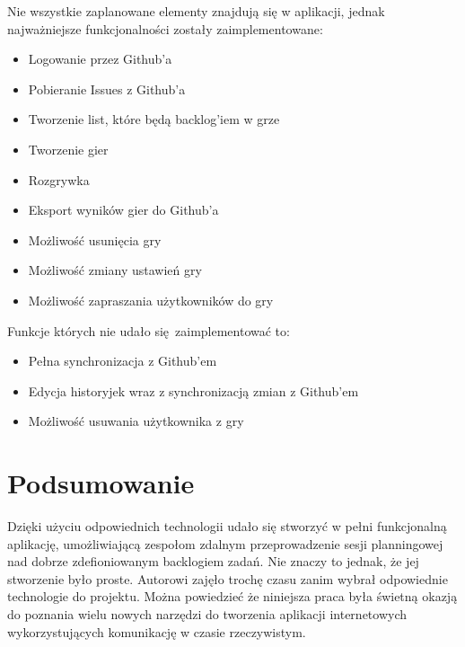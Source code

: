 Nie wszystkie zaplanowane elementy znajdują się w aplikacji,
jednak najważniejsze funkcjonalności zostały zaimplementowane:

 \begin{itemize}
	\item Logowanie przez Github'a
	\item Pobieranie Issues z Github'a
	\item Tworzenie list, które będą backlog'iem w grze
	\item Tworzenie gier
	\item Rozgrywka
	\item Eksport wyników gier do Github'a
	\item Możliwość usunięcia gry
	\item Możliwość zmiany ustawień gry
	\item Możliwość zapraszania użytkowników do gry
\end{itemize}

Funkcje których nie udało się zaimplementować to:

\begin{itemize}
	\item Pełna synchronizacja z Github'em
	\item Edycja historyjek wraz z synchronizacją zmian z Github'em
	\item Możliwość usuwania użytkownika z gry
\end{itemize}

\section{Podsumowanie}

Dzięki użyciu odpowiednich technologii udało się stworzyć w pełni funkcjonalną aplikację,
umożliwiającą zespołom zdalnym przeprowadzenie sesji planningowej nad dobrze
zdefioniowanym backlogiem zadań.
Nie znaczy to jednak, że jej stworzenie było proste.
Autorowi zajęło trochę czasu zanim wybrał odpowiednie technologie do projektu.
Można powiedzieć że niniejsza praca była świetną okazją do poznania
wielu nowych narzędzi do tworzenia aplikacji internetowych wykorzystujących
komunikację w czasie rzeczywistym.
